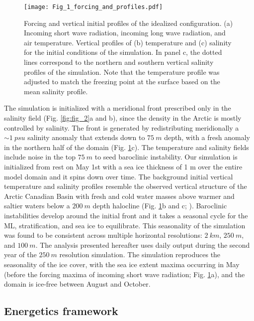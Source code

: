\documentclass[draft]{agujournal2019}
\begin{document}
\begin{figure}
  \texttt{[image: Fig\_1\_forcing\_and\_profiles.pdf]}
  \caption{Forcing and vertical initial profiles of the idealized configuration. (a) Incoming short wave radiation, incoming long wave radiation, and air temperature. Vertical profiles of (b) temperature and (c) salinity for the initial conditions of the simulation. In panel c, the dotted lines correspond to the northern and southern vertical salinity profiles of the simulation. Note that the temperature profile was adjusted to match the freezing point at the surface based on the mean salinity profile.}
  \label{fig:fig_1}
\end{figure}

The simulation is initialized with a meridional front prescribed only in the salinity field (Fig. \ref{fig:fig_2}a and b), since the density in the Arctic is mostly controlled by salinity. The front is generated by redistributing meridionally a $\sim 1\ psu$ salinity anomaly that extends down to $75\ m$ depth, with a fresh anomaly in the northern half of the domain (Fig. \ref{fig:fig_1}c). The temperature and salinity fields include noise in the top $75\ m$ to seed baroclinic instability. Our simulation is initialized from rest on May 1st with a sea ice thickness of 1 m over the entire model domain and it spins down over time. The background initial vertical temperature and salinity profiles resemble the observed vertical structure of the Arctic Canadian Basin with fresh and cold water masses above warmer and saltier waters below a $200\ m$ depth halocline (Fig. \ref{fig:fig_1}b and c; \citealt{Metzner_halocline_2023}). Baroclinic instabilities develop around the initial front and it takes a seasonal cycle for the ML, stratification, and sea ice to equilibrate. This seasonality of the simulation was found to be consistent across multiple horizontal resolutions: $2\ km$, $250\ m$, and $100\ m$. The analysis presented hereafter uses daily output during the second year of the $250\ m$ resolution simulation. The simulation reproduces the seasonality of the ice cover, with the sea ice extent maxima occurring in May (before the forcing maxima of incoming short wave radiation; Fig. \ref{fig:fig_1}a), and the domain is ice-free between August and October. 

\subsection{Energetics framework}
\end{document}
